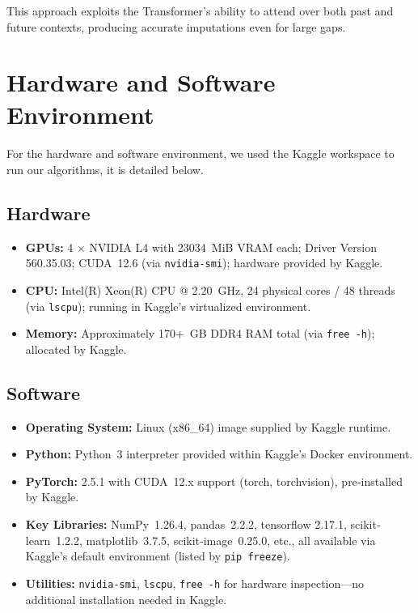 \documentclass[10pt,twocolumn]{article}
\begin{document}
	This approach exploits the Transformer's ability to attend over both past and future contexts, producing accurate imputations even for large gaps.
	

	\section{Hardware and Software Environment}
	\paragraph{}
	For the hardware and software environment, we used the Kaggle workspace to run our algorithms, it is detailed below.
	\subsection{Hardware}
	\begin{itemize}
		\item \textbf{GPUs:} 4 $\times$ NVIDIA L4 with 23034 MiB VRAM each; Driver Version 560.35.03; CUDA 12.6 (via \texttt{nvidia-smi}); hardware provided by Kaggle.
		\item \textbf{CPU:} Intel(R) Xeon(R) CPU @ 2.20 GHz, 24 physical cores / 48 threads (via \texttt{lscpu}); running in Kaggle’s virtualized environment.
		\item \textbf{Memory:} Approximately 170+ GB DDR4 RAM total (via \texttt{free -h}); allocated by Kaggle.
	\end{itemize}
	\subsection{Software}
	\begin{itemize}
		\item \textbf{Operating System:} Linux (x86\_64) image supplied by Kaggle runtime.
		\item \textbf{Python:} Python 3 interpreter provided within Kaggle’s Docker environment.
		\item \textbf{PyTorch:} 2.5.1 with CUDA 12.x support (torch, torchvision), pre‐installed by Kaggle.
		\item \textbf{Key Libraries:} NumPy 1.26.4, pandas 2.2.2, tensorflow 2.17.1, scikit‐learn 1.2.2, matplotlib 3.7.5, scikit‐image 0.25.0, etc., all available via Kaggle’s default environment (listed by \texttt{pip freeze}).
		\item \textbf{Utilities:} \texttt{nvidia-smi}, \texttt{lscpu}, \texttt{free -h} for hardware inspection—no additional installation needed in Kaggle.
	\end{itemize}
	
\end{document}
